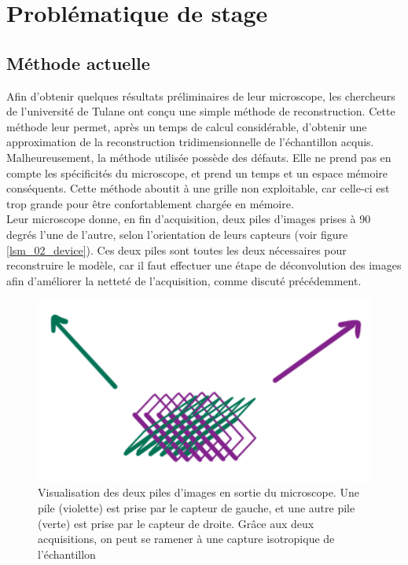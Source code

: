 \documentclass[utf8]{stageM2R}
\begin{document}
	\chapter{Problématique de stage}\label{section:03_stage_problematique}
	{
		\section{Méthode actuelle}\label{section:03_01_methode_actuelle}
		{
			Afin d'obtenir quelques résultats préliminaires de leur microscope, les chercheurs de l'université de Tulane ont conçu une simple méthode de reconstruction. Cette méthode leur permet, après un temps de calcul considérable, d'obtenir une approximation de la reconstruction tridimensionnelle de l'échantillon acquis.\\

			Malheureusement, la méthode utilisée possède des défauts. Elle ne prend pas en compte les spécificités du microscope, et prend un temps et un espace mémoire conséquents. Cette méthode aboutit à une grille non exploitable, car celle-ci est trop grande pour être confortablement chargée en mémoire.\\

			Leur microscope donne, en fin d'acquisition, deux piles d'images prises à 90 degrés l'une de l'autre, selon l'orientation de leurs capteurs (voir figure \ref{lsm_02_device}). Ces deux piles sont toutes les deux nécessaires pour reconstruire le modèle, car il faut effectuer une étape de déconvolution des images afin d'améliorer la netteté de l'acquisition, comme discuté précédemment.\\

			\begin{figure}[h]
				\centering
				\includegraphics[width=0.5\linewidth]{./img/tulane_reconstruction_04_image_stacks.png}
				\caption{Visualisation des deux piles d'images en sortie du microscope. Une pile (violette) est prise par le capteur de gauche, et une autre pile (verte) est prise par le capteur de droite. Grâce aux deux acquisitions, on peut se ramener à une capture isotropique de l'échantillon}
				\label{img:tulane_04_img_stacks}
			\end{figure}

}}
\end{document}
